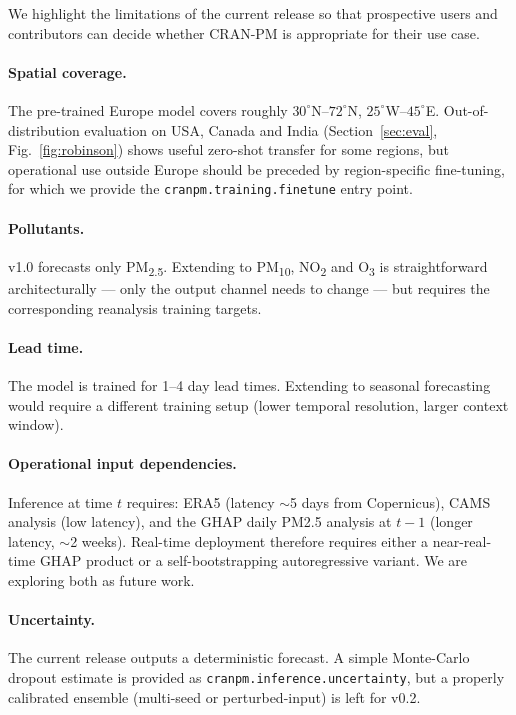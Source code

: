 
We highlight the limitations of the current release so that prospective
users and contributors can decide whether CRAN-PM is appropriate for
their use case.

\paragraph{Spatial coverage.}
The pre-trained Europe model covers roughly $30^\circ$N--$72^\circ$N,
$25^\circ$W--$45^\circ$E. Out-of-distribution evaluation on USA, Canada
and India (Section~\ref{sec:eval}, Fig.~\ref{fig:robinson}) shows useful
zero-shot transfer for some regions, but operational use outside Europe
should be preceded by region-specific fine-tuning, for which we provide
the \texttt{cranpm.training.finetune} entry point.

\paragraph{Pollutants.}
v1.0 forecasts only PM\textsubscript{2.5}. Extending to PM\textsubscript{10},
NO\textsubscript{2} and O\textsubscript{3} is straightforward
architecturally — only the output channel needs to change — but requires
the corresponding reanalysis training targets.

\paragraph{Lead time.}
The model is trained for 1--4 day lead times. Extending to seasonal
forecasting would require a different training setup (lower temporal
resolution, larger context window).

\paragraph{Operational input dependencies.}
Inference at time $t$ requires: ERA5 (latency $\sim$5 days from
Copernicus), CAMS analysis (low latency), and the GHAP daily PM2.5
analysis at $t-1$ (longer latency, $\sim$2 weeks). Real-time deployment
therefore requires either a near-real-time GHAP product or a
self-bootstrapping autoregressive variant. We are exploring both as
future work.

\paragraph{Uncertainty.}
The current release outputs a deterministic forecast. A simple
Monte-Carlo dropout estimate is provided as
\texttt{cranpm.inference.uncertainty}, but a properly calibrated ensemble
(multi-seed or perturbed-input) is left for v0.2.

